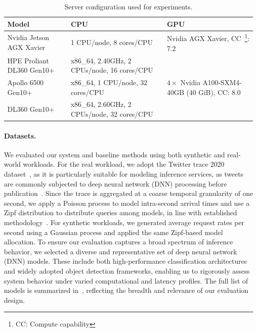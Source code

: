 \begin{table}
	\centering
	\begin{tabular}{p{2cm}p{3cm}p{3cm}}
		\toprule
		\textbf{Model}            & \textbf{CPU}                                & \textbf{GPU}                                                 \\
		\toprule

		Nvidia Jetson AGX Xavier  & 1 CPU/node, 8 cores/CPU                     & Nvidia AGX Xavier, CC~\footnote{CC: Compute capability}: 7.2 \\

		\midrule

		HPE Proliant DL360 Gen10+ & x86\_64, 2.40GHz, 2 CPUs/node, 16 cores/CPU &                                                              \\

		\midrule

		Apollo 6500 Gen10+        & x86\_64, 1 CPU/node, 32 cores/CPU           & $4\times$ Nvidia A100-SXM4-40GB (40 GiB), CC: 8.0            \\

		\midrule

		DL360 Gen10+              & x86\_64, 2.60GHz, 2 CPUs/node, 32 cores/CPU &                                                              \\

		\bottomrule
	\end{tabular}
	\caption{Server conﬁguration used for experiments.}
	\label{tab:serve_config}
\end{table}

\paragraph{Datasets.} We evaluated our system and baseline methods using both synthetic and real-world workloads. For the real workload, we adopt the Twitter trace 2020 dataset~\cite{twitterStreamTrace2020}, as it is particularly suitable for modeling inference services, as tweets are commonly subjected to deep neural network (DNN) processing before publication~\cite{francisco2021infaas,ahmad2024proteus}. Since the trace is aggregated at a coarse temporal granularity of one second, we apply a Poisson process to model intra-second arrival times and use a Zipf distribution to distribute queries among models, in line with established methodology~\cite{francisco2021infaas,ahmad2024proteus}.
For synthetic workloads, we generated average request rates per second using a Gaussian process and applied the same Zipf-based model allocation. To ensure our evaluation captures a broad spectrum of inference behavior, we selected a diverse and representative set of deep neural network (DNN) models. These include both high-performance classification architectures and widely adopted object detection frameworks, enabling us to rigorously assess system behavior under varied computational and latency profiles. The full list of models is summarized in~, reflecting the breadth and relevance of our evaluation design.

